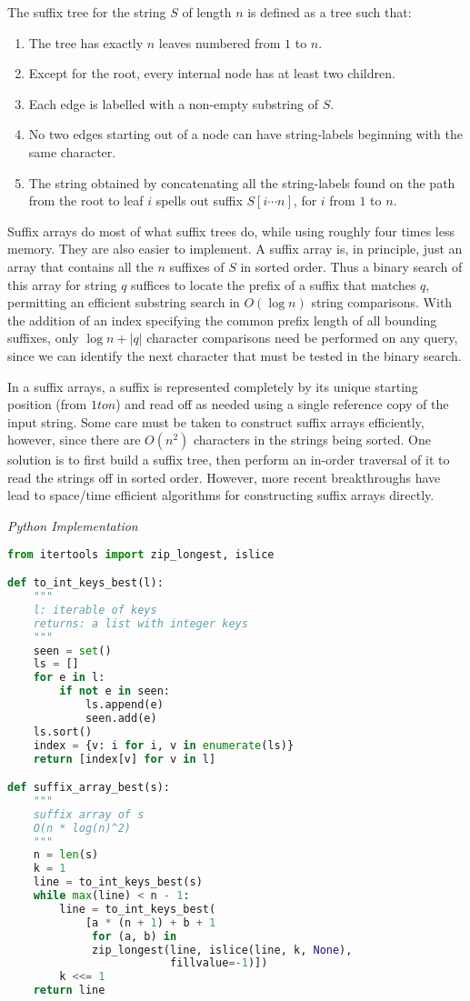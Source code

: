 \documentclass{article}
\begin{document}
    The suffix tree for the string $S$ of length $n$ is defined as a tree such that:
    \begin{enumerate}
        \item The tree has exactly $n$ leaves numbered from $1$ to $n$.
        \item Except for the root, every internal node has at least two children.
        \item Each edge is labelled with a non-empty substring of $S$.
        \item No two edges starting out of a node can have string-labels beginning with the same character.
        \item The string obtained by concatenating all the string-labels found on the path from the root to leaf $i$ spells out suffix $S[i \cdots n]$, for $i$ from $1$ to $n$.
    \end{enumerate}
    Suffix arrays do most of what suffix trees do, while using roughly four times less memory. They are also easier to implement. A suffix array is, in principle, just an array that contains all the $n$ suffixes of $S$ in sorted order. Thus a binary search of this array for string $q$ suffices to locate the prefix of a suffix that matches $q$, permitting an efficient substring search in $O(\log n)$ string comparisons. With the addition of an index specifying the common prefix length of all bounding suffixes, only $\log n+|q|$ character comparisons need be performed on any query, since we can identify the next character that must be tested in the binary search.
    
    In a suffix arrays, a suffix is represented completely by its unique starting position (from $1 to n$) and read off as needed using a single reference copy of the input string. Some care must be taken to construct suffix arrays efficiently, however, since there are $O(n^2)$ characters in the strings being sorted. One solution is to first build a suffix tree, then perform an in-order traversal of it to read the strings off in sorted order. However, more recent breakthroughs have lead to space/time efficient algorithms for constructing suffix arrays directly.

\vspace{8pt} \emph{Python Implementation}
\begin{lstlisting}[language=Python]
from itertools import zip_longest, islice

def to_int_keys_best(l):
    """
    l: iterable of keys
    returns: a list with integer keys
    """
    seen = set()
    ls = []
    for e in l:
        if not e in seen:
            ls.append(e)
            seen.add(e)
    ls.sort()
    index = {v: i for i, v in enumerate(ls)}
    return [index[v] for v in l]

def suffix_array_best(s):
    """
    suffix array of s
    O(n * log(n)^2)
    """
    n = len(s)
    k = 1
    line = to_int_keys_best(s)
    while max(line) < n - 1:
        line = to_int_keys_best(
            [a * (n + 1) + b + 1
             for (a, b) in
             zip_longest(line, islice(line, k, None),
                         fillvalue=-1)])
        k <<= 1
    return line
\end{lstlisting}
\end{document}
